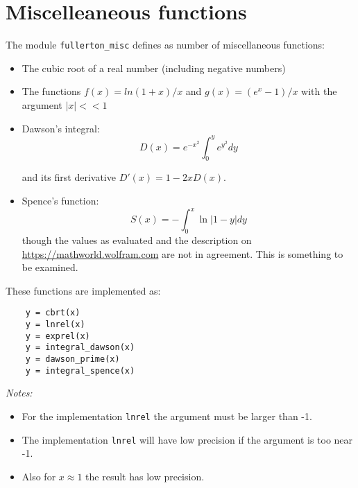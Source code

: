 \documentclass{article}
\begin{document}
\section{Miscelleaneous functions}
The module \verb+fullerton_misc+ defines as number of miscellaneous functions:

\begin{itemize}
\item
The cubic root of a real number (including negative numbers)
\item
The functions $f(x) = ln(1+x)/x$ and $g(x) = (e^x-1)/x$ with the argument $|x| << 1$
\item
Dawson's integral:
\begin{equation}
     D(x) = e^{-x^2} \int^y_0 e^{y^2} dy
\end{equation}

\noindent and its first derivative $D'(x) = 1 - 2 x D(x)$.
\item
Spence's function:
\begin{equation}
     S(x) = - \int^x_0 \ln |1-y| dy
\end{equation}
\noindent though the values as evaluated and the description on \url{https://mathworld.wolfram.com} are
not in agreement. This is something to be examined.
\end{itemize}

These functions are implemented as:
\begin{verbatim}
    y = cbrt(x)
    y = lnrel(x)
    y = exprel(x)
    y = integral_dawson(x)
    y = dawson_prime(x)
    y = integral_spence(x)
\end{verbatim}

\emph{Notes:}
\begin{itemize}
\item
For the implementation \verb+lnrel+ the argument must be larger than -1.
\item
The implementation \verb+lnrel+ will have low precision if the argument is too near -1.
\item
Also for $x \approx 1$ the result has low precision.
\end{itemize}
\end{document}
